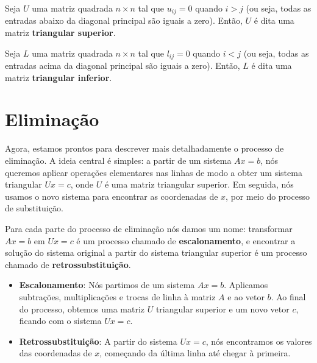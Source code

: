 \begin{Definition}
	Seja $U$ uma matriz quadrada $n\times n$ tal que $u_{ij} = 0$ quando $i > j$ (ou seja, todas as entradas abaixo da diagonal principal são iguais a zero). Então, $U$ é dita uma matriz \textbf{triangular superior}.
\end{Definition}

\begin{Definition}
	Seja $L$ uma matriz quadrada $n\times n$ tal que $l_{ij} = 0$ quando $i < j$ (ou seja, todas as entradas acima da diagonal principal são iguais a zero). Então, $L$ é dita uma matriz \textbf{triangular inferior}.
\end{Definition}

\section{Eliminação}
Agora, estamos prontos para descrever mais detalhadamente o processo de eliminação. A ideia central é simples: a partir de um sistema $Ax = b$, nós queremos aplicar operações elementares nas linhas de modo a obter um sistema triangular $Ux = c$, onde $U$ é uma matriz triangular superior. Em seguida, nós usamos o novo sistema para encontrar as coordenadas de $x$, por meio do processo de substituição.

Para cada parte do processo de eliminação nós damos um nome: transformar $Ax = b$ em $Ux = c$ é um processo chamado de \textbf{escalonamento}, e encontrar a solução do sistema original a partir do sistema triangular superior é um processo chamado de \textbf{retrossubstituição}.

\begin{itemize}
	\item \textbf{Escalonamento}: Nós partimos de um sistema $Ax = b$. Aplicamos subtrações, multiplicações e trocas de linha à matriz $A$ e ao vetor $b$. Ao final do processo, obtemos uma matriz $U$ triangular superior e um novo vetor $c$, ficando com o sistema $Ux = c$.
	
	\item \textbf{Retrossubstituição}: A partir do sistema $Ux = c$, nós encontramos os valores das coordenadas de $x$, começando da última linha até chegar à primeira.
\end{itemize}

